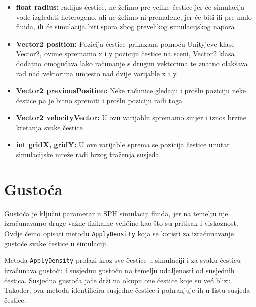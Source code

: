 \documentclass[diplomskirad]{fer}
\begin{document}
    \begin{itemize}
        \item \textbf{float radius:} radijus čestice, ne želimo pre velike čestice jer će simulacija vode izgledati heterogeno, ali ne želimo ni premalene, jer će biti ili pre malo fluida,
        ili će simulacija biti spora zbog prevelikog simulacijskog napora
        \item \textbf{Vector2 position:} Pozicija čestice prikazana pomoću Unityjeve klase Vector2, ovime spremamo x i y poziciju čestice na sceni, Vector2 klasa dodatno omogućava lako računanje
        s drugim vektorima te znatno olakšava rad nad vektorima umjesto nad dvije varijable x i y.
        \item \textbf{Vector2 previousPosition:} Neke računice gledaju i prošlu poziciju neke čestice pa je bitno spremiti i prošlu poziciju radi toga
        \item \textbf{Vector2 velocityVector:} U ovu varijablu spremamo smjer i iznos brzine kretanja svake čestice
        \item \textbf{int gridX, gridY:} U ove varijable sprema se pozicija čestice unutar simulacijske mreže radi brzog traženja susjeda
    \end{itemize}


    \section{Gustoća}\label{sec:gustoca}

    Gustoća je ključni parametar u SPH simulaciji fluida, jer na temelju nje izračunavamo druge važne fizikalne veličine kao što su pritisak i viskoznost.
    Ovdje ćemo opisati metodu \texttt{ApplyDensity} koja se koristi za izračunavanje gustoće svake čestice u simulaciji.

    Metoda \texttt{ApplyDensity} prolazi kroz sve čestice u simulaciji i za svaku česticu izračunava gustoću i susjednu gustoću na temelju udaljenosti od susjednih čestica.
    Susjedna gustoća jače drži na okupu one čestice koje su već blizu.
    Također, ova metoda identificira susjedne čestice i pohranjuje ih u listu susjeda čestice.
\end{document}
